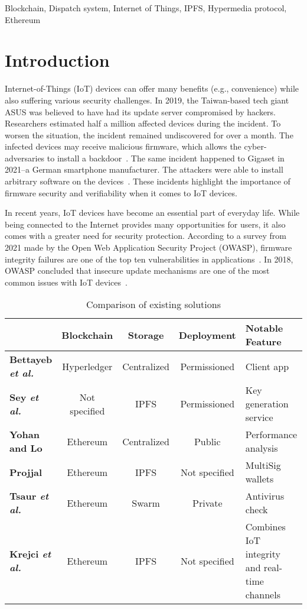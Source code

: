 \documentclass[conference]{IEEEtran}
\begin{document}
\begin{IEEEkeywords}
Blockchain, Dispatch system, Internet of Things, IPFS, Hypermedia protocol, Ethereum
\end{IEEEkeywords}


\section{Introduction}
Internet-of-Things (IoT) devices can offer many benefits (e.g., convenience) while also suffering various security challenges. In 2019, the Taiwan-based tech giant ASUS was believed to have had its update server compromised by hackers. Researchers estimated half a million affected devices during the incident. To worsen the situation, the incident remained undiscovered for over a month. The infected devices may receive malicious firmware, which allows the cyber-adversaries to install a backdoor~\cite{Zetter}. The same incident happened to Gigaset in 2021--a German smartphone manufacturer. The attackers were able to install arbitrary software on the devices~\cite{THN}. These incidents highlight the importance of firmware security and verifiability when it comes to IoT devices.

In recent years, IoT devices have become an essential part of everyday life. While being connected to the Internet provides many opportunities for users, it also comes with a greater need for security protection. According to a survey from 2021 made by the Open Web Application Security Project (OWASP), firmware integrity failures are one of the top ten vulnerabilities in applications~\cite{OWASP1}. In 2018, OWASP concluded that insecure update mechanisms are one of the most common issues with IoT devices~\cite{OWASP2}.

\begin{table*}[t]
\centering
\caption{Comparison of existing solutions}
\label{tab:LiteratureComparison}
\begin{tabular}{@{}lSSSm{4cm}@{}}
&{\textbf{Blockchain}}&{\textbf{Storage}}&{\textbf{Deployment}}&{\textbf{Notable Feature}} \\ \toprule
{\textbf{Bettayeb \emph{et al.}~\cite{Bettayeb2021}}}&{Hyperledger}&{Centralized}&{Permissioned}&{Client app} \\ \midrule
{\textbf{Sey \emph{et al.}~\cite{Sey2021}}}&{Not specified}&{IPFS}&{Permissioned}&{Key generation service} \\ \midrule
{\textbf{Yohan and Lo~\cite{Yohan2020}}}&{Ethereum}&{Centralized}&{Public}&{Performance analysis} \\ \midrule
{\textbf{Projjal \cite{Projjal2020}}}&{Ethereum}&{IPFS}&{Not specified}&{MultiSig wallets} \\ \midrule
{\textbf{Tsaur \emph{et al.}~\cite{Tsaur2020}}}&{Ethereum}&{Swarm}&{Private}&{Antivirus check} \\ \midrule
{\textbf{Krejci \emph{et al.}~\cite{Krejci2020} }}&{Ethereum}&{IPFS}&{Not specified}&{Combines IoT integrity and real-time channels} \\ \bottomrule
\end{tabular}
\vspace{-3mm}
\end{table*}
\end{document}
